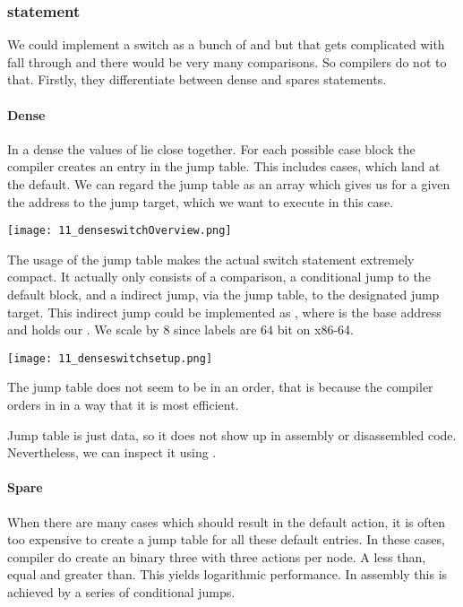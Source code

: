 

\subsubsection{ statement}
We could implement a switch as a bunch of  and  but that gets complicated with fall through and there would be very many comparisons. So compilers do not to that. Firstly, they differentiate between dense and spares  statements. 

\paragraph{Dense }
In a dense  the values of  lie close together. For each possible case block the compiler creates an entry in the jump table. This includes cases, which land at the default. We can regard the jump table as an array which gives us for a given  the address to the jump target, which we want to execute in this case.

\texttt{[image: 11\_denseswitchOverview.png]}

The usage of the jump table makes the actual switch statement extremely compact. It actually only consists of a comparison, a conditional jump to the default block, and a indirect jump, via the jump table, to the designated jump target. This indirect jump could be implemented as , where  is the base address and  holds our . We scale by $8$ since labels are $64$ bit on x86-64.

\texttt{[image: 11\_denseswitchsetup.png]}

The jump table does not seem to be in an order, that is because the compiler orders in in a way that it is most efficient.

Jump table is just data, so it does not show up in assembly or disassembled code. Nevertheless, we can inspect it using .

\paragraph{Spare }
When there are many cases which should result in the default action, it is often too expensive to create a jump table for all these default entries. In these cases, compiler do create an binary three with three actions per node. A less than, equal and greater than. This yields logarithmic performance. In assembly this is achieved by a series of conditional jumps.

